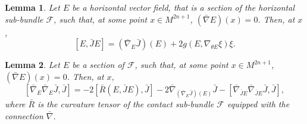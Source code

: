 \documentclass[10pt,a4paper]{amsart}
\newtheorem{lemma}{Lemma}
\newcommand{\f}{\mathcal{F}}
\begin{document}
\begin{lemma}\label{lemma2}
  Let $E$ be a horizontal vector field, that is a section of the
  horizontal sub-bundle $\f$, such that, at some point
  $x\in M^{2n+1}$, $(\bar{\nabla}E)(x)=0$. Then, at $x$,
$$[E,\bar{J}E]= (\bar{\nabla}_E \bar{J}) (E) +2 g(E, \nabla_{\theta E} \xi) \xi .$$
\end{lemma}

\begin{lemma}\label{lemma3.2}
  Let $E$ be a section of $\f$, such that, at some point
  $x\in M^{2n+1}$, $(\bar{\nabla}E)(x)=0$. Then, at $x$,
  $$
  [\bar{\nabla}_E \bar{\nabla}_E \bar{J},\bar{J}] = -2 [\bar{R}(E,\bar{J}E),\bar{J}
  ]-2\bar{\nabla}_{(\bar{\nabla}_E \bar{J})(E)}\bar{J}- [\bar{\nabla}_{\bar{J}E}
  \bar{\nabla}_{\bar{J}E} \bar{J},\bar{J}],
  $$
where $\bar{R}$ is the curvature tensor of the contact sub-bundle
$\f$ equipped with the connection $\bar{\nabla}$.
\end{lemma}
\end{document}
